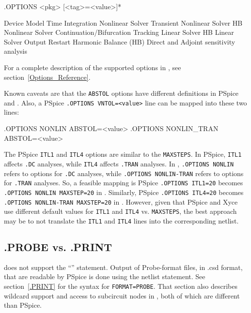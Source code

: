 \begin{Command}
\format
.OPTIONS <pkg> [<tag>=<value>]*

\arguments

\begin{Arguments}
       Device Model
      Time Integration
       Nonlinear Solver
  Transient Nonlinear Solver
    HB Nonlinear Solver
         Continuation/Bifurcation Tracking
       Linear Solver
    HB Linear Solver
       Output
      Restart
        Harmonic Balance (HB)
  Direct and Adjoint sensitivity analysis
\end{Arguments}

\end{Command}


For a complete description of the supported options in \Xyce{}, see
section~\ref{Options_Reference}.  

Known caveats are that the \texttt{ABSTOL} options have different definitions 
in PSpice and \Xyce{}.  Also, a PSpice \texttt{.OPTIONS VNTOL=<value>} line can 
be mapped into these two \Xyce{} lines:
\begin{vquote}
.OPTIONS NONLIN ABSTOL=<value> 
.OPTIONS NONLIN_TRAN ABSTOL=<value>
\end{vquote}

The PSpice \texttt{ITL1} and \texttt{ITL4} options are similar to the \Xyce{} \texttt{MAXSTEPS}.
In PSpice, \texttt{ITL1} affects \texttt{.DC} analyses, while \texttt{ITL4} 
affects \texttt{.TRAN} analyses.  In \Xyce{}, \texttt{.OPTIONS NONLIN}
refers to options for \texttt{.DC} analyses, while \texttt{.OPTIONS NONLIN-TRAN}
refers to options for \texttt{.TRAN} analyses.  So, a feasible mapping is 
PSpice \texttt{.OPTIONS ITL1=20} becomes \texttt{.OPTIONS NONLIN MAXSTEP=20}
in \Xyce{}.  Similarly, PSpice \texttt{.OPTIONS ITL4=20} becomes 
\texttt{.OPTIONS NONLIN-TRAN MAXSTEP=20} in \Xyce{}.  However, given that
PSpice and Xyce{} use different default values for \texttt{ITL1} and \texttt{ITL4} 
vs. \texttt{MAXSTEPS}, the best approach may be to not translate the \texttt{ITL1} and 
\texttt{ITL4} lines into the corresponding \Xyce{} netlist.

\subsection{.PROBE vs. .PRINT}
\Xyce{} does not support the ``'' statement.  Output of Probe-format
files, in .csd format, that are readable by PSpice is done using the  netlist statement.
See section~\ref{.PRINT} for the syntax for \texttt{FORMAT=PROBE}.  That section
also describes wildcard support and access to subcircuit nodes in \Xyce{}, both of
which are different than PSpice.

